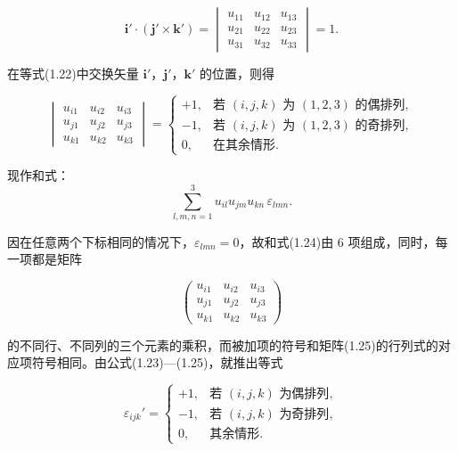 \documentclass[11pt,a4paper,oneside]{ctexbook}
\newcommand{\ve}[1]{\bm{#1}}
\begin{document}
\begin{equation}
\ve{i}' \cdot (\ve{j}' \times \ve{k}') =
\begin{vmatrix}
u_{11} & u_{12} & u_{13}\\
u_{21} & u_{22} & u_{23}\\
u_{31} & u_{32} & u_{33}
\end{vmatrix} = 1.
\tag{1.22}
\end{equation}

在等式(1.22)中交换矢量 $\ve{i}'$，$\ve{j}'$，$\ve{k}'$ 的位置，则得

\begin{equation}
\begin{vmatrix}
u_{i1} & u_{i2} & u_{i3}\\
u_{j1} & u_{j2} & u_{j3}\\
u_{k1} & u_{k2} & u_{k3}
\end{vmatrix} =
\begin{cases}
+1, & \text{若 } (i,j,k) \text{ 为 } (1,2,3) \text{ 的偶排列},\\
-1, & \text{若 } (i,j,k) \text{ 为 } (1,2,3) \text{ 的奇排列},\\
0,  & \text{在其余情形}.
\end{cases}
\tag{1.23}
\end{equation}

现作和式：
\begin{equation}
\sum_{l,m,n=1}^{3} u_{il} u_{jm} u_{kn}\, \varepsilon_{lmn}.
\tag{1.24}
\end{equation}

因在任意两个下标相同的情况下，$\varepsilon_{lmn} = 0$，故和式(1.24)由 6 项组成，同时，每一项都是矩阵

\begin{equation}
\begin{pmatrix}
u_{i1} & u_{i2} & u_{i3}\\
u_{j1} & u_{j2} & u_{j3}\\
u_{k1} & u_{k2} & u_{k3}
\end{pmatrix}
\tag{1.25}
\end{equation}

的不同行、不同列的三个元素的乘积，而被加项的符号和矩阵(1.25)的行列式的对应项符号相同。由公式(1.23)—(1.25)，就推出等式

\begin{equation*}
\varepsilon_{ijk}' =
\begin{cases}
+1, & \text{若 } (i,j,k) \text{ 为偶排列},\\
-1, & \text{若 } (i,j,k) \text{ 为奇排列},\\
0,  & \text{其余情形}.
\end{cases}
\end{equation*}
\end{document}
